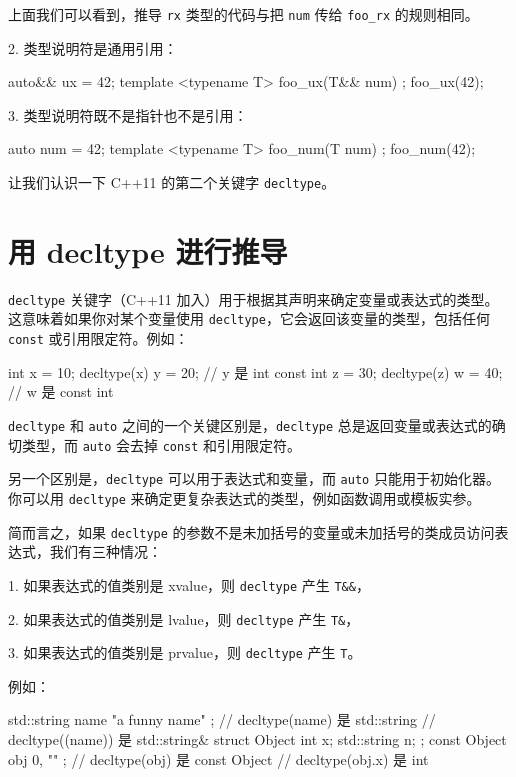 上面我们可以看到，推导 \texttt{rx} 类型的代码与把 \texttt{num} 传给 \texttt{foo\_rx} 的规则相同。

2. 类型说明符是通用引用：

\begin{codebox}[cpp]
auto&& ux = 42;
template <typename T> foo_ux(T&& num) { };
foo_ux(42);
\end{codebox}

3. 类型说明符既不是指针也不是引用：

\begin{codebox}[cpp]
auto num = 42;
template <typename T> foo_num(T num) { };
foo_num(42);
\end{codebox}

让我们认识一下 C++11 的第二个关键字 \texttt{decltype}。

\section{用 decltype 进行推导}

\texttt{decltype} 关键字（C++11 加入）用于根据其声明来确定变量或表达式的类型。这意味着如果你对某个变量使用 \texttt{decltype}，它会返回该变量的类型，包括任何 \texttt{const} 或引用限定符。例如：

\begin{codebox}[cpp]
int x = 10;
decltype(x) y = 20; // y 是 int
const int z = 30;
decltype(z) w = 40; // w 是 const int
\end{codebox}

\texttt{decltype} 和 \texttt{auto} 之间的一个关键区别是，\texttt{decltype} 总是返回变量或表达式的确切类型，而 \texttt{auto} 会去掉 \texttt{const} 和引用限定符。

另一个区别是，\texttt{decltype} 可以用于表达式和变量，而 \texttt{auto} 只能用于初始化器。你可以用 \texttt{decltype} 来确定更复杂表达式的类型，例如函数调用或模板实参。

简而言之，如果 \texttt{decltype} 的参数不是未加括号的变量或未加括号的类成员访问表达式，我们有三种情况：

1. 如果表达式的值类别是 xvalue，则 \texttt{decltype} 产生 \texttt{T\&\&}，

2. 如果表达式的值类别是 lvalue，则 \texttt{decltype} 产生 \texttt{T\&}，

3. 如果表达式的值类别是 prvalue，则 \texttt{decltype} 产生 \texttt{T}。

例如：

\begin{codebox}[cpp]
std::string name { "a funny name" };
// decltype(name) 是 std::string
// decltype((name)) 是 std::string&
struct Object { int x; std::string n; };
const Object obj { 0, "" };
// decltype(obj) 是 const Object
// decltype(obj.x) 是 int
\end{codebox}

